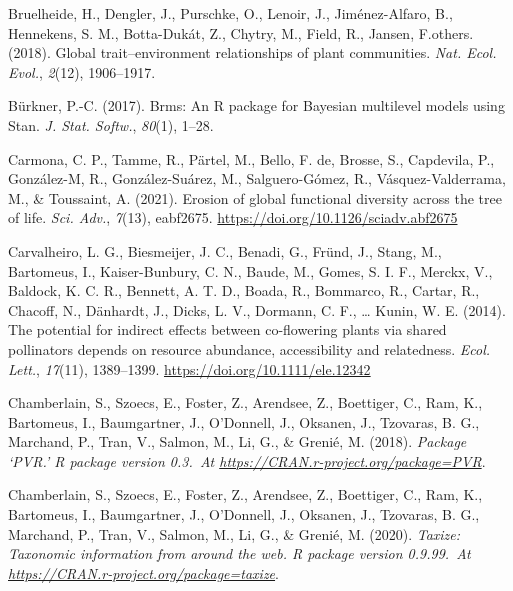 \documentclass[
  12pt,
  a4paper,
]{article}
\newlength{\cslhangindent}
\newlength{\cslentryspacingunit} %
\newenvironment{CSLReferences}[2] %
 {%
  \setlength{\parindent}{0pt}
  \ifodd #1
  \let\oldpar\par
  \def\par{\hangindent=\cslhangindent\oldpar}
  \fi
  \setlength{\parskip}{#2\cslentryspacingunit}
 }%
 {}
\begin{document}
\begin{CSLReferences}{1}{0}
\leavevmode{}%
Bruelheide, H., Dengler, J., Purschke, O., Lenoir, J., Jiménez-Alfaro, B., Hennekens, S. M., Botta-Dukát, Z., Chytry, M., Field, R., Jansen, F.others. (2018). Global trait--environment relationships of plant communities. \emph{Nat. Ecol. Evol.}, \emph{2}(12), 1906--1917.

\leavevmode{}%
Bürkner, P.-C. (2017). Brms: {An R} package for {Bayesian} multilevel models using {Stan}. \emph{J. Stat. Softw.}, \emph{80}(1), 1--28.

\leavevmode{}%
Carmona, C. P., Tamme, R., Pärtel, M., Bello, F. de, Brosse, S., Capdevila, P., González-M, R., González-Suárez, M., Salguero-Gómez, R., Vásquez-Valderrama, M., \& Toussaint, A. (2021). Erosion of global functional diversity across the tree of life. \emph{Sci. Adv.}, \emph{7}(13), eabf2675. \url{https://doi.org/10.1126/sciadv.abf2675}

\leavevmode{}%
Carvalheiro, L. G., Biesmeijer, J. C., Benadi, G., Fründ, J., Stang, M., Bartomeus, I., Kaiser-Bunbury, C. N., Baude, M., Gomes, S. I. F., Merckx, V., Baldock, K. C. R., Bennett, A. T. D., Boada, R., Bommarco, R., Cartar, R., Chacoff, N., Dänhardt, J., Dicks, L. V., Dormann, C. F., \ldots{} Kunin, W. E. (2014). The potential for indirect effects between co-flowering plants via shared pollinators depends on resource abundance, accessibility and relatedness. \emph{Ecol. Lett.}, \emph{17}(11), 1389--1399. \url{https://doi.org/10.1111/ele.12342}

\leavevmode{}%
Chamberlain, S., Szoecs, E., Foster, Z., Arendsee, Z., Boettiger, C., Ram, K., Bartomeus, I., Baumgartner, J., O'Donnell, J., Oksanen, J., Tzovaras, B. G., Marchand, P., Tran, V., Salmon, M., Li, G., \& Grenié, M. (2018). \emph{Package {`{PVR}.'} R package version 0.3.~At \href{https://CRAN.R-project.org/package=PVR}{https://CRAN.r-project.org/package=PVR}}.

\leavevmode{}%
Chamberlain, S., Szoecs, E., Foster, Z., Arendsee, Z., Boettiger, C., Ram, K., Bartomeus, I., Baumgartner, J., O'Donnell, J., Oksanen, J., Tzovaras, B. G., Marchand, P., Tran, V., Salmon, M., Li, G., \& Grenié, M. (2020). \emph{Taxize: {Taxonomic} information from around the web. R package version 0.9.99.~At \href{https://CRAN.R-project.org/package=taxize}{https://CRAN.r-project.org/package=taxize}}.


\end{CSLReferences}
\end{document}
